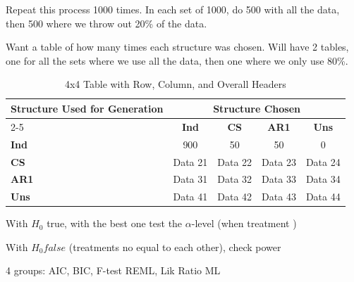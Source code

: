 \documentclass{article}
\begin{document}
Repeat this process 1000 times. In each set of 1000, do 500 with all the data, then 500 where we throw out 20\% of the data.

Want a table of how many times each structure was chosen. Will have 2 tables, one for all the sets where we use all the data, then one where we only use 80\%.
\begin{table}[ht]
    \centering
    \caption{4x4 Table with Row, Column, and Overall Headers}
    \label{tab:4x4_complex}
    \begin{tabular}{l | c c c c}
        \toprule
        \multirow{2}{*}{\textbf{Structure Used for Generation}} & \multicolumn{4}{c}{\textbf{Structure Chosen}} \\
        \cmidrule{2-5}
        & \textbf{Ind} & \textbf{CS} & \textbf{AR1} & \textbf{Uns} \\
        \midrule
        \textbf{Ind} & 900 & 50 & 50 & 0 \\
        \textbf{CS} & Data 21 & Data 22 & Data 23 & Data 24 \\
        \textbf{AR1} & Data 31 & Data 32 & Data 33 & Data 34 \\
        \textbf{Uns} & Data 41 & Data 42 & Data 43 & Data 44 \\
        \bottomrule
    \end{tabular}
\end{table}



With $H_0$ true, with the best one test the $\alpha$-level (when treatment )

With $H_0 false$ (treatments no equal to each other), check power



4 groups: AIC, BIC, F-test REML, Lik Ratio ML
\end{document}
